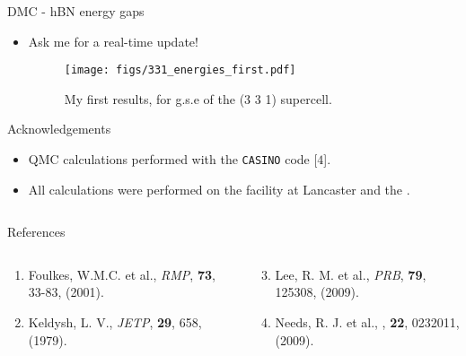 \documentclass[hyperref={draft}]{beamer}
\newcommand{\red}[1]{{\bf\color{red}{#1}}}
\begin{document}
\begin{frame}[fragile]
\begin{columns}[T]
\begin{column}{.46\textwidth}
\begin{block}{DMC - hBN energy gaps}
\begin{itemize}
\item \red{Progress?} Ask me for a real-time update!
\begin{figure}[H]

	\centering
	\texttt{[image: figs/331\_energies\_first.pdf]}
	\caption{My first results, for g.s.e of the (3 3 1) supercell.}
	\label{331_dmc_fist}

\end{figure}
\end{itemize}

\end{block}

\begin{block}{Acknowledgements}
\begin{itemize}
\item QMC calculations performed with the \texttt{CASINO} code [$4$].
\item All calculations were performed on the \red{HEC} facility at Lancaster and the \red{N8 HPC}.
\end{itemize}
\end{block}
\end{column}
\end{columns}

\begin{center}
\begin{minipage}{0.993\textwidth}
\begin{block}{References}
\begin{columns}[T]

\begin{column}{.38\textwidth}
\begin{enumerate}
\item Foulkes, W.M.C. et al., \textit{RMP}, {\bf 73}, 33-83, (2001).
\item Keldysh, L. V., \textit{JETP}, {\bf 29}, 658, (1979).
\end{enumerate}
\end{column}

\begin{column}{.55\textwidth}
\begin{enumerate}
\setcounter{enumi}{2}
\item Lee, R. M. et al., \textit{PRB}, {\bf 79}, 125308, (2009).
\item Needs, R. J. et al., , {\bf 22}, 0232011, (2009).
\end{enumerate}
\end{column}

\end{columns}

\end{block}
\end{minipage}
\end{center}
\end{frame}
\end{document}
